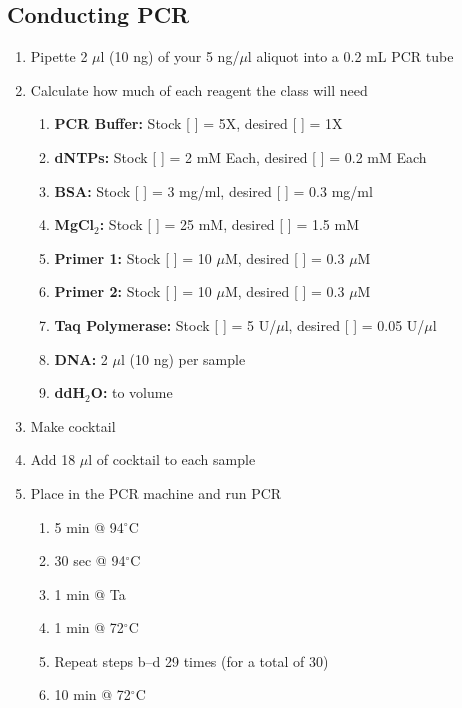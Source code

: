 \documentclass[12pt, hidelinks]{article}
\begin{document}
	
	\subsection{Conducting PCR}	
		\begin{enumerate}
			\item Pipette 2 $\mu$l (10 ng) of your 5 ng/$\mu$l aliquot into a 0.2 mL PCR tube
			\item Calculate how much of each reagent the class will need
				\begin{enumerate}
					\item \textbf{PCR Buffer:} Stock [ ] = 5X, desired [ ] = 1X
					\item \textbf{dNTPs:} Stock [ ] = 2 mM Each, desired [ ] = 0.2 mM Each
					\item \textbf{BSA:} Stock [ ] = 3 mg/ml, desired [ ] = 0.3 mg/ml
					\item \textbf{MgCl$_{2}$:} Stock [ ] = 25 mM, desired [ ] = 1.5 mM
					\item \textbf{Primer 1:} Stock [ ] = 10 $\mu$M, desired [ ] = 0.3 $\mu$M
					\item \textbf{Primer 2:} Stock [ ] = 10 $\mu$M, desired [ ] = 0.3 $\mu$M
					\item \textbf{Taq Polymerase:} Stock [ ] = 5 U/$\mu$l, desired [ ] = 0.05 U/$\mu$l
					\item \textbf{DNA:} 2 $\mu$l (10 ng) per sample
					\item \textbf{ddH$_{2}$O:} to volume
				\end{enumerate}
			\item Make cocktail
			\item Add 18 $\mu$l of cocktail to each sample
			\item Place in the PCR machine and run PCR
				\begin{enumerate}
					\item 5 min @ 94$^{\circ}$C
					\item 30 sec @ 94$^{\circ}$C
					\item 1 min @ Ta
					\item 1 min @ 72$^{\circ}$C
					\item Repeat steps b--d 29 times (for a total of 30)
					\item 10 min @ 72$^{\circ}$C
				\end{enumerate}		
		\end{enumerate}	
\end{document}
